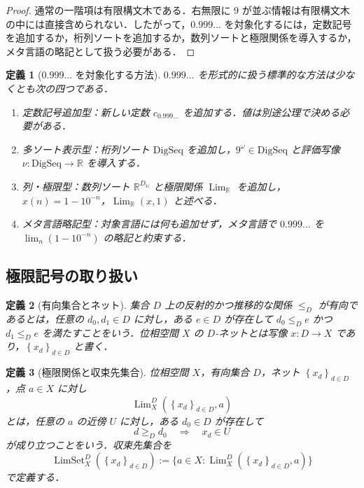 \documentclass[a4paper,11pt]{ltjsarticle}
\theoremstyle{jpdef}
\newtheorem{definition}{定義}[section]
\theoremstyle{jpthm}
\newcommand{\N}{\mathbb{N}}
\newcommand{\R}{\mathbb{R}}
\newcommand{\Lim}{\operatorname{Lim}}
\newcommand{\LimSet}{\operatorname{LimSet}}
\newcommand{\DN}{D_{\N}}
\newcommand{\seq}[2]{\left\{#1\right\}_{#2}}
\begin{document}
\begin{proof}
通常の一階項は有限構文木である．右無限に \(9\) が並ぶ情報は有限構文木の中には直接含められない．したがって，\(0.999\ldots\) を対象化するには，定数記号を追加するか，桁列ソートを追加するか，数列ソートと極限関係を導入するか，メタ言語の略記として扱う必要がある．
\end{proof}

\begin{definition}[\(0.999\ldots\) を対象化する方法]
\(0.999\ldots\) を形式的に扱う標準的な方法は少なくとも次の四つである．
\begin{enumerate}
\item 定数記号追加型：新しい定数 \(c_{0.999\ldots}\) を追加する．値は別途公理で決める必要がある．
\item 多ソート表示型：桁列ソート \(\mathrm{DigSeq}\) を追加し，\(9^\omega\in\mathrm{DigSeq}\) と評価写像 \(\nu:\mathrm{DigSeq}\to\R\) を導入する．
\item 列・極限型：数列ソート \(\R^{\DN}\) と極限関係 \(\Lim_\R\) を追加し，\(x(n)=1-10^{-n}\)，\(\Lim_\R(x,1)\) と述べる．
\item メタ言語略記型：対象言語には何も追加せず，メタ言語で \(0.999\ldots\) を \(\lim_n(1-10^{-n})\) の略記と約束する．
\end{enumerate}
\end{definition}

\subsection{極限記号の取り扱い}

\begin{definition}[有向集合とネット]
集合 \(D\) 上の反射的かつ推移的な関係 \(\le_D\) が有向であるとは，任意の \(d_0,d_1\in D\) に対し，ある \(e\in D\) が存在して \(d_0\le_D e\) かつ \(d_1\le_D e\) を満たすことをいう．位相空間 \(X\) の \(D\)-ネットとは写像 \(x:D\to X\) であり，\(\seq{x_d}{d\in D}\) と書く．
\end{definition}

\begin{definition}[極限関係と収束先集合]
位相空間 \(X\)，有向集合 \(D\)，ネット \(\seq{x_d}{d\in D}\)，点 \(a\in X\) に対し
\[
  \Lim_X^D(\seq{x_d}{d\in D},a)
\]
とは，任意の \(a\) の近傍 \(U\) に対し，ある \(d_0\in D\) が存在して
\[
  d\ge_D d_0\quad\Rightarrow\quad x_d\in U
\]
が成り立つことをいう．収束先集合を
\[
  \LimSet_X^D(\seq{x_d}{d\in D})
  :=\{a\in X:\Lim_X^D(\seq{x_d}{d\in D},a)\}
\]
で定義する．
\end{definition}
\end{document}
